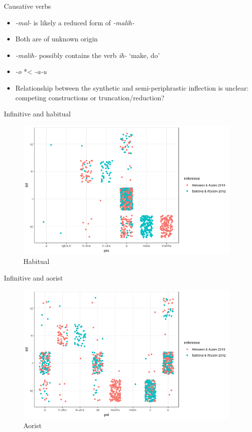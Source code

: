 \begin{frame}{Causative verbs}
\begin{itemize}
    \item \textit{-mal-} is likely a reduced form of \textit{-malih-}
    \item Both are of unknown origin
    \item \textit{-malih-} possibly contains the verb \textit{ih-} `make, do'
    \item \textit{-o} *< \textit{-a-u}
    \item Relationship between the synthetic and semi-periphrastic inflection is unclear: competing constructions or truncation/reduction?
\end{itemize}
\end{frame}


\begin{frame}{Infinitive and habitual}

\begin{figure}[h]
\centering
\caption{Habitual}
\includegraphics[scale=0.45]{images/infxprs.png}
\end{figure}

\end{frame}

\begin{frame}{Infinitive and aorist}

\begin{figure}[h]
\centering
\caption{Aorist}
\includegraphics[scale=0.45]{images/infxpst.png}
\end{figure}

\end{frame}

